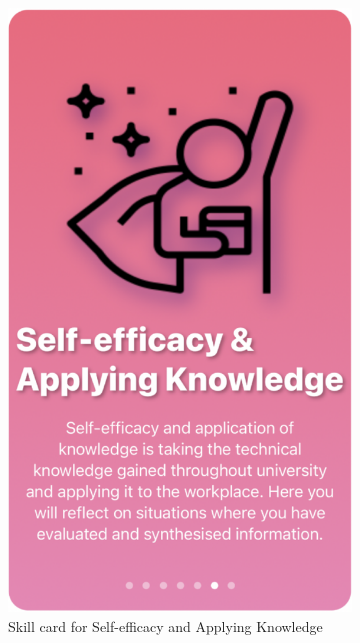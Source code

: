 \documentclass{l4proj}
\begin{document}
\begin{appendices}
\begin{figure}[H]
\begin{subfigure}[b]{0.3\textwidth}
        \includegraphics[scale=0.2]{images/SE-AKCard.pdf}
        \caption{Skill card for Self-efficacy and Applying Knowledge}
        \label{fig:SE-AKCard}
    \end{subfigure}
    \begin{subfigure}[b]{0.3\textwidth}

\end{subfigure}
\end{figure}
\end{appendices}
\end{document}

